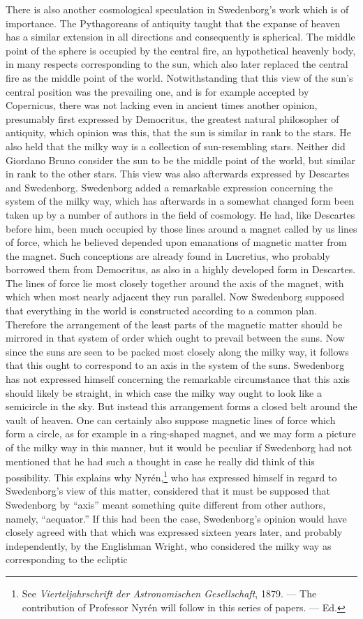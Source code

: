 \documentclass[a4paper, 11pt, oneside, polutonikogreek, english]{article}
\begin{document}
There is also another cosmological speculation in Swedenborg's work which is of importance. The Pythagoreans of antiquity taught that the expanse of heaven has a similar extension in all directions and consequently is spherical. The middle point of the sphere is occupied by the central fire, an hypothetical heavenly body, in many respects corresponding to the sun, which also later replaced the central fire as the middle point of the world. Notwithstanding that this view of the sun's central position was the prevailing one, and is for example accepted by Copernicus, there was not lacking even in ancient times another opinion, presumably first expressed by Democritus, the greatest natural philosopher of antiquity, which opinion was this, that the sun is similar in rank to the stars. He also held that the milky way is a collection of sun-resembling stars. Neither did Giordano Bruno consider the sun to be the middle point of the world, but similar in rank to the other stars. This view was also afterwards expressed by Descartes and Swedenborg. Swedenborg added a remarkable expression concerning the system of the milky way, which has afterwards in a somewhat changed form been taken up by a number of authors in the field of cosmology. He had, like Descartes before him, been much occupied by those lines around a magnet called by us lines of force, which he believed depended upon emanations of magnetic matter from the magnet. Such conceptions are already found in Lucretius, who probably borrowed them from Democritus, as also in a highly developed form in Descartes. The lines of force lie most closely together around the axis of the magnet, with which when most nearly adjacent they run parallel. Now Swedenborg supposed that everything in the world is constructed according to a common plan. Therefore the arrangement of the least parts of the magnetic matter should be mirrored in that system of order which ought to prevail between the suns. Now since the suns are seen to be packed most closely along the milky way, it follows that this ought to correspond to an axis in the system of the suns. Swedenborg has not expressed himself concerning the remarkable circumstance that this axis should likely be straight, in which case the milky way ought to look like a semicircle in the sky. But instead this arrangement forms a closed belt around the vault of heaven. One can certainly also suppose magnetic lines of force which form a circle, as for example in a ring-shaped magnet, and we may form a picture of the milky way in this manner, but it would be peculiar if Swedenborg had not mentioned that he had such a thought in case he really did think of this possibility. This explains why Nyrén,\footnote{See \emph{Vierteljahrschrift der Astronomischen Gesellschaft}, 1879. --- The contribution of Professor Nyrén will follow in this series of papers. --- Ed.} who has expressed himself in regard to Swedenborg's view of this matter, considered that it must be supposed that Swedenborg by ``axis'' meant something quite different from other authors, namely, ``aequator.'' If this had been the case, Swedenborg's opinion would have closely agreed with that which was expressed sixteen years later, and probably independently, by the Englishman Wright, who considered the milky way as corresponding to the ecliptic 
\end{document}
